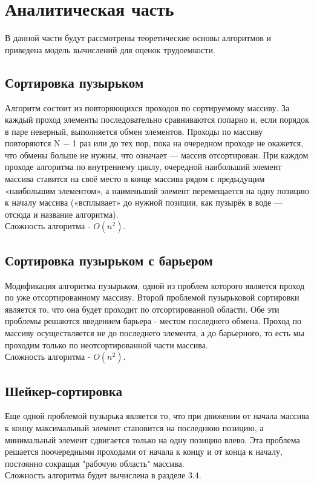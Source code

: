 \documentclass[a4paper, 14pt]{article}
\begin{document}
    	\newpage
        \section{Аналитическая часть}

		\parindent=1cm
		В данной части будут рассмотрены теоретические основы алгоритмов и приведена модель вычислений для оценок трудоемкости.
		\subsection{Сортировка пузырьком}
		\parindent=1cm
Алгоритм состоит из повторяющихся проходов по сортируемому массиву. За каждый проход элементы последовательно сравниваются попарно и,
если порядок в паре неверный, выполняется обмен элементов. Проходы по
массиву повторяются N − 1 раз или до тех пор, пока на очередном проходе
не окажется, что обмены больше не нужны, что означает — массив отсортирован. При каждом проходе алгоритма по внутреннему циклу, очередной
наибольший элемент массива ставится на своё место в конце массива рядом
с предыдущим «наибольшим элементом», а наименьший элемент перемещается на одну позицию к началу массива («всплывает» до нужной позиции,
как пузырёк в воде — отсюда и название алгоритма).\\
		Сложность алгоритма - $O(n^2)$\cite{knut}.
		\subsection{Сортировка пузырьком с барьером}
		\parindent=1cm
		Модификация алгоритма пузырьком, одной из проблем которого является проход по уже отсортированному массиву.	Второй проблемой пузырьковой сортировки является то, что она будет проходит по отсортированной области. Обе эти проблемы решаются введением барьера - местом последнего обмена. Проход по массиву осуществляется не до последнего элемента, а до барьерного, то есть мы проходим только по неотсортированной части массива.\\
		Сложность алгоритма - $O(n^2)$\cite{knut}.
		\subsection{Шейкер-сортировка}
		\parindent=1cm
		Еще одной проблемой пузырька является то, что при движении от начала массива к концу максимальный элемент становится на последнюю позицию, а минимальный элемент сдвигается только на одну позицию влево. Эта проблема решается поочередными проходами от начала к концу и от конца к началу, постоянно сокращая "рабочую область" массива.\\
		Сложность алгоритма будет вычислена в разделе 3.4.
	
\end{document}

